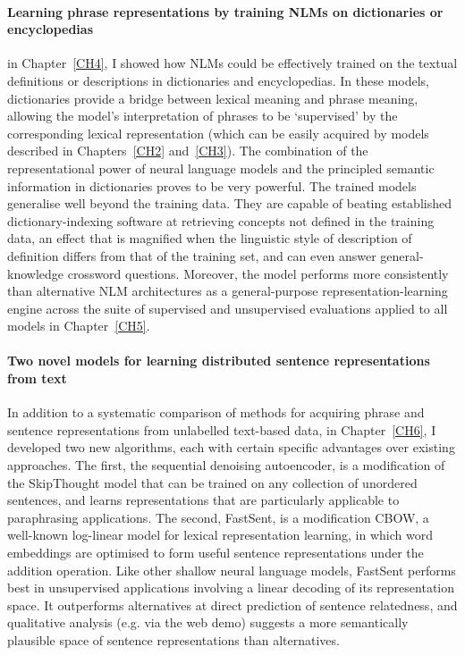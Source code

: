 \paragraph{Learning phrase representations by training NLMs on dictionaries or encyclopedias} in Chapter~\ref{CH4}, I showed how NLMs could be effectively trained on the textual definitions or descriptions in dictionaries and encyclopedias. In these models, dictionaries provide a bridge between lexical meaning and phrase meaning, allowing the model's interpretation of phrases to be `supervised' by the corresponding lexical representation (which can be  easily acquired by models described in Chapters~\ref{CH2} and~\ref{CH3}). The combination of the representational power of neural language models and the principled semantic information in dictionaries proves to be very powerful. The trained models generalise well beyond the training data. They are capable of beating established dictionary-indexing software at retrieving concepts not defined in the training data, an effect that is magnified when the linguistic style of description of definition differs from that of the training set, and can even answer general-knowledge crossword questions. Moreover, the model performs more consistently than alternative NLM architectures as a general-purpose representation-learning engine across the suite of supervised and unsupervised evaluations applied to all models in Chapter~\ref{CH5}.

\paragraph{Two novel models for learning distributed sentence representations from text} In addition to a systematic comparison of methods for acquiring phrase and sentence representations from unlabelled text-based data, in Chapter~\ref{CH6}, I developed two new algorithms, each with certain specific advantages over existing approaches. The first, the sequential denoising autoencoder, is a modification of the SkipThought model that can be trained on any collection of unordered sentences, and learns representations that are particularly applicable to paraphrasing applications. The second, FastSent, is a modification CBOW, a well-known log-linear model for lexical representation learning, in which word embeddings are optimised to form useful sentence representations under the addition operation. Like other shallow neural language models, FastSent performs best in unsupervised applications involving a linear decoding of its representation space. It outperforms alternatives at direct prediction of sentence relatedness, and qualitative analysis (e.g. via the web demo) suggests a more semantically plausible space of sentence representations than alternatives.       

